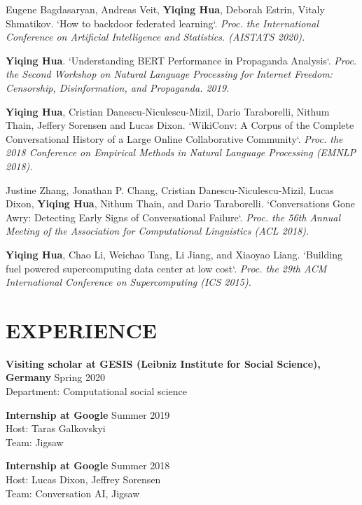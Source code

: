 \documentclass[margin, 10pt]{res} %
\begin{document}
\begin{resume}
Eugene Bagdasaryan, Andreas Veit, \textbf{Yiqing Hua}, Deborah Estrin, Vitaly Shmatikov.
`How to backdoor federated learning`.
\textit{Proc. the International Conference on Artificial Intelligence and Statistics. (AISTATS 2020).}

\textbf{Yiqing Hua}.
`Understanding BERT Performance in Propaganda Analysis`.  
\textit{Proc. the Second Workshop on Natural Language Processing for Internet Freedom: Censorship, Disinformation, and Propaganda. 2019.}

\textbf{Yiqing Hua}, Cristian Danescu-Niculescu-Mizil, Dario Taraborelli, Nithum Thain, Jeffery Sorensen and Lucas Dixon.
`WikiConv: A Corpus of the Complete Conversational History of a Large Online Collaborative Community`.   
\textit{Proc. the 2018 Conference on Empirical Methods in Natural Language Processing (EMNLP 2018).}

Justine Zhang, Jonathan P. Chang, Cristian Danescu-Niculescu-Mizil, Lucas Dixon, \textbf{Yiqing Hua}, Nithum Thain, and Dario Taraborelli.
`Conversations Gone Awry: Detecting Early Signs of Conversational Failure`.   
\textit{Proc. the 56th Annual Meeting of the Association for Computational Linguistics (ACL 2018).}

\textbf{Yiqing Hua}, Chao Li, Weichao Tang, Li Jiang, and Xiaoyao Liang.
`Building fuel powered supercomputing data center at low cost`.   
\textit{Proc. the 29th ACM International Conference on Supercomputing (ICS 2015).}

\section{EXPERIENCE}
\textbf{Visiting scholar at GESIS (Leibniz Institute for Social Science), Germany} \hfill Spring 2020\\
Department: Computational social science

\textbf{Internship at Google} \hfill Summer 2019\\
Host: Taras Galkovskyi\\
Team: Jigsaw

\textbf{Internship at Google} \hfill Summer 2018\\
Host: Lucas Dixon, Jeffrey Sorensen\\
Team: Conversation AI, Jigsaw



\end{resume}
\end{document}
